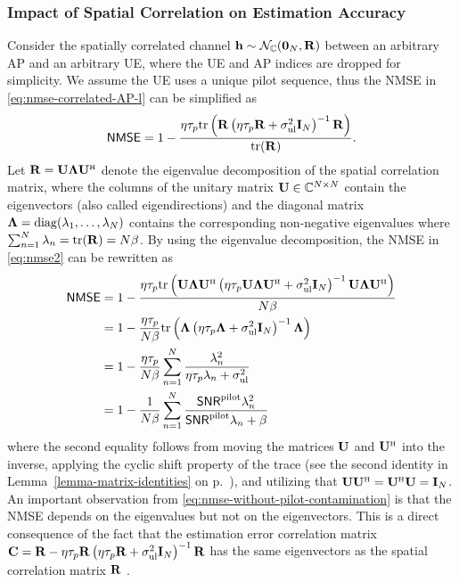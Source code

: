 \subsubsection{Impact of Spatial Correlation on Estimation Accuracy}
Consider the spatially correlated channel $\mathbf{h} \sim \mathcal{N}_{\mathbb{C}} ( \mathbf{0}_N, \mathbf{R}  )$ between an arbitrary AP and an arbitrary UE, where the \gls{UE} and \gls{AP} indices are dropped for simplicity. We assume the UE uses a unique pilot sequence, thus the \gls{NMSE} in \eqref{eq:nmse-correlated-AP-l} can be simplified as
\begin{equation} \label{eq:nmse2}
\mathsf{NMSE}=1-\frac{\eta \tau_p \mathrm{tr}\left(\mathbf{R} \left(\eta\tau_p\mathbf{R}+\sigma^2_{\mathrm{ul}}\mathbf{I}_N\right)^{-1}   \mathbf{R}\right) }{ \mathrm{tr}( \mathbf{R} )}.
\end{equation}
Let $\vect{R} = \vect{U} \vect{\Lambda} \vect{U}^{\Htran}$ denote the eigenvalue decomposition of the spatial correlation matrix, where the columns of the unitary matrix $\mathbf{U} \in \mathbb{C}^{N \times N}$ contain the eigenvectors (also called eigendirections) and the diagonal matrix $\mathbf{\Lambda} = \mathrm{diag}(\lambda_1,\ldots,\lambda_N)$ contains the corresponding non-negative eigenvalues where $\sum_{n=1}^N\lambda_n=\mathrm{tr}( \mathbf{R} )=N\beta$.
By using the eigenvalue decomposition, the NMSE in \eqref{eq:nmse2} can be rewritten as
\begin{align} \label{eq:nmse-without-pilot-contamination}
\mathacr{NMSE}&=1-\frac{\eta \tau_p \tr\left(\vect{U}\vect{\Lambda}\vect{U}^{\Htran} \left(\eta\tau_p\vect{U}\vect{\Lambda}\vect{U}^{\Htran}+\sigmaUL\vect{I}_N\right)^{-1}  \vect{U}\vect{\Lambda}\vect{U}^{\Htran}\right) }{ N\beta} \nonumber \\
&=1-\frac{\eta\tau_p}{N\beta}\tr\left(\vect{\Lambda} \left( \eta \tau_p \vect{\Lambda}+\sigmaUL\vect{I}_N \right)^{-1} \vect{\Lambda}\right) \nonumber \\
&=1-\frac{\eta\tau_p}{N\beta}\sum_{n=1}^N \frac{\lambda_n^2}{\eta\tau_p\lambda_n+\sigmaUL}\nonumber\\
&=1-\frac{1}{N\beta}\sum_{n=1}^N \frac{\mathacr{SNR}^{\text{pilot}}\lambda_n^2}{\mathacr{SNR}^{\text{pilot}}\lambda_n+\beta}
\end{align}
where the second equality follows from moving the matrices $\mathbf{U}$ and $\vect{U}^{\Htran}$ into the inverse, applying the cyclic shift property of the trace (see the second identity in Lemma~\ref{lemma-matrix-identities} on p.~\pageref{lemma-matrix-identities}), and utilizing that $\vect{U}\vect{U}^{\Htran}= \vect{U}^{\Htran}\vect{U}=\vect{I}_N$. An important observation from \eqref{eq:nmse-without-pilot-contamination} is that the NMSE depends on the eigenvalues but not on the eigenvectors. This is a direct consequence of the fact that the estimation error correlation matrix $\mathbf{C} = \mathbf{R} - \eta \tau_p \mathbf{R} \left(\eta\tau_p\mathbf{R}+\sigma^2_{\mathrm{ul}}\mathbf{I}_N\right)^{-1}   \mathbf{R} $ has the same eigenvectors as the spatial correlation matrix $\mathbf{R}$ \cite[Sec.~3.3]{massivemimobook}.

